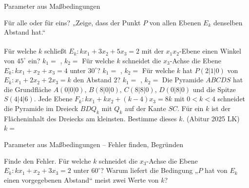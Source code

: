 \setcounter{aufgabe}{13}

\begin{aufgabe}{Parameter aus Maßbedingungen}
\begin{teile}
\teil Für alle oder für eins? „Zeige, dass der Punkt $P$ von allen Ebenen $E_k$ denselben Abstand hat.“ \\  \\ 
\teil Für welche $k$ schließt $E_k: k x_1 + 3x_2 + 5x_3 = 2$ mit der $x_1x_2$-Ebene einen Winkel von $45^\circ$ ein? $k_1 = $ \leerfeld , $k_2 = $ \leerfeld
\teil Für welche $k$ schneidet die $x_3$-Achse die Ebene $E_k: k x_1 + x_2 + x_3 = 4$ unter $30^\circ$? $k_1 = $ \leerfeld , $k_2 = $ \leerfeld
\teil Für welche $k$ hat $P(2 | 1 | 0)$ von $E_k: x_1 + 2x_2 + 2x_3 = k$ den Abstand $2$? $k_1 = $ \leerfeld , $k_2 = $ \leerfeld
\teil Die Pyramide $ABCDS$ hat die Grundfläche $A(0 | 0 | 0)$, $B(8 | 0 | 0)$, $C(8 | 8 | 0)$, $D(0 | 8 | 0)$ und die Spitze $S(4 | 4 | 6)$. Jede Ebene $F_k: k x_1 + k x_2 + (k - 4) x_3 = 8k$ mit $0 < k < 4$ schneidet die Pyramide im Dreieck $BDQ_k$ mit $Q_k$ auf der Kante $SC$. Für ein $k$ ist der Flächeninhalt des Dreiecks am kleinsten. Bestimme dieses $k$. \hfill (Abitur 2025 LK) \\ $k = $ \leerfeld
\end{teile}
\end{aufgabe}

\begin{aufgabe}{Parameter aus Maßbedingungen – Fehler finden, Begründen}
\begin{teile}
\teil Finde den Fehler. Für welche $k$ schneidet die $x_3$-Achse die Ebene $E_k: k x_1 + x_2 + 3x_3 = 2$ unter $60^\circ$? 
\teil Warum liefert die Bedingung „$P$ hat von $E_k$ einen vorgegebenen Abstand“ meist zwei Werte von $k$?
\end{teile}
\end{aufgabe}
